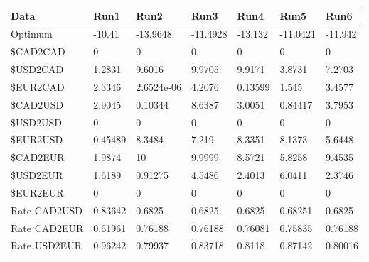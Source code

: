 \begin{tabular}{lllllll}
Data & Run1 & Run2 & Run3 & Run4 & Run5 & Run6 \\ 
\hline 
Optimum & -10.41 & -13.9648 & -11.4928 & -13.132 & -11.0421 & -11.942 \\ 
\$CAD2CAD & 0 & 0 & 0 & 0 & 0 & 0 \\ 
\$USD2CAD & 1.2831 & 9.6016 & 9.9705 & 9.9171 & 3.8731 & 7.2703 \\ 
\$EUR2CAD & 2.3346 & 2.6524e-06 & 4.2076 & 0.13599 & 1.545 & 3.4577 \\ 
\$CAD2USD & 2.9045 & 0.10344 & 8.6387 & 3.0051 & 0.84417 & 3.7953 \\ 
\$USD2USD & 0 & 0 & 0 & 0 & 0 & 0 \\ 
\$EUR2USD & 0.45489 & 8.3484 & 7.219 & 8.3351 & 8.1373 & 5.6448 \\ 
\$CAD2EUR & 1.9874 & 10 & 9.9999 & 8.5721 & 5.8258 & 9.4535 \\ 
\$USD2EUR & 1.6189 & 0.91275 & 4.5486 & 2.4013 & 6.0411 & 2.3746 \\ 
\$EUR2EUR & 0 & 0 & 0 & 0 & 0 & 0 \\ 
Rate CAD2USD & 0.83642 & 0.6825 & 0.6825 & 0.6825 & 0.68251 & 0.6825 \\ 
Rate CAD2EUR & 0.61961 & 0.76188 & 0.76188 & 0.76081 & 0.75835 & 0.76188 \\ 
Rate USD2EUR & 0.96242 & 0.79937 & 0.83718 & 0.8118 & 0.87142 & 0.80016 \\ 
\hline 
\end{tabular}